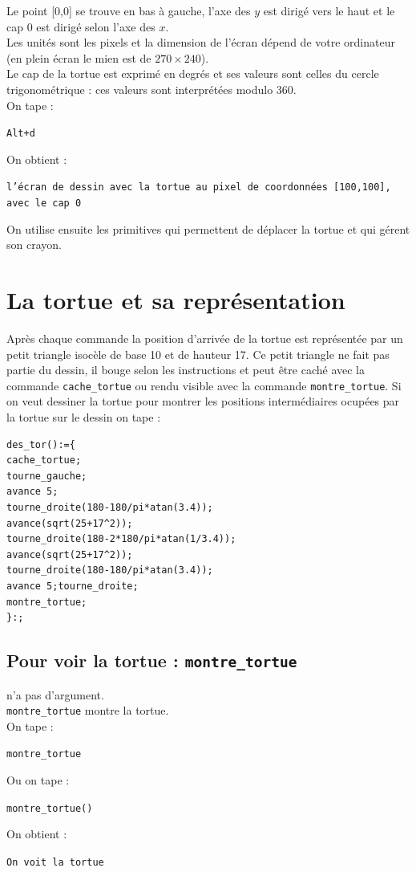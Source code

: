 \documentclass[a4paper,11pt]{book}
\begin{document}
Le point [0,0] se trouve en bas \`a gauche, l'axe des $y$ est dirig\'e vers le
haut et le cap 0 est dirig\'e selon l'axe des $x$.\\
 Les unit\'es sont les pixels et la dimension de l'\'ecran d\'epend de 
votre ordinateur (en plein \'ecran le mien est de $270 \times 240$).\\ 
Le cap de la tortue est exprim\'e en degr\'es et ses valeurs sont celles du 
cercle trigonom\'etrique : ces valeurs sont interpr\'et\'ees modulo 360.\\
On tape :
\begin{center}{\tt Alt+d}\end{center}
On obtient :
\begin{center}{\tt l'\'ecran de dessin avec la tortue au pixel de coordonn\'ees
 [100,100], avec le cap 0}\end{center}
On utilise ensuite les primitives qui permettent de d\'eplacer la tortue et 
qui g\'erent son crayon.

\section{La tortue et sa repr\'esentation}
Apr\`es chaque commande la position d'arriv\'ee de la tortue est 
repr\'esent\'ee par un petit triangle isoc\`ele de base 10 et de hauteur 17. 
Ce petit triangle ne fait pas partie du dessin, il bouge selon les 
instructions et peut \^etre cach\'e avec la commande {\tt cache\_tortue}
ou rendu visible avec la commande {\tt montre\_tortue}.
Si on veut dessiner la tortue pour montrer les positions interm\'ediaires 
ocup\'ees par la tortue sur le dessin on tape :
\begin{verbatim}
des_tor():={
cache_tortue;
tourne_gauche;
avance 5;
tourne_droite(180-180/pi*atan(3.4));
avance(sqrt(25+17^2));
tourne_droite(180-2*180/pi*atan(1/3.4));
avance(sqrt(25+17^2));
tourne_droite(180-180/pi*atan(3.4));
avance 5;tourne_droite;
montre_tortue;
}:;
\end{verbatim}

\subsection{Pour voir la tortue : {\tt montre\_tortue}}
 n'a pas d'argument.\\
{\tt montre\_tortue} montre la tortue.\\
On tape :
\begin{center}{\tt montre\_tortue}\end{center}
Ou on tape :
\begin{center}{\tt montre\_tortue()}\end{center}
On obtient :
\begin{center}{\tt On voit la tortue}\end{center}
\end{document}
